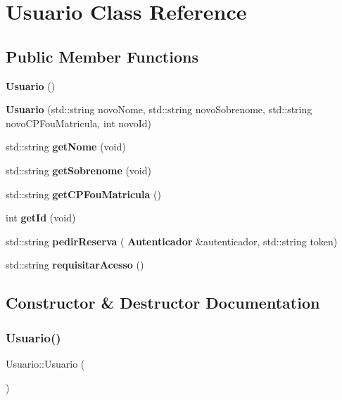\section{Usuario Class Reference}
\label{class_usuario}
\subsection*{Public Member Functions}
\begin{DoxyCompactItemize}
\item 
\textbf{ Usuario} ()
\item 
\textbf{ Usuario} (std\+::string novo\+Nome, std\+::string novo\+Sobrenome, std\+::string novo\+C\+P\+Fou\+Matricula, int novo\+Id)
\item 
std\+::string \textbf{ get\+Nome} (void)
\item 
std\+::string \textbf{ get\+Sobrenome} (void)
\item 
std\+::string \textbf{ get\+C\+P\+Fou\+Matricula} ()
\item 
int \textbf{ get\+Id} (void)
\item 
std\+::string \textbf{ pedir\+Reserva} (\textbf{ Autenticador} \&autenticador, std\+::string token)
\item 
std\+::string \textbf{ requisitar\+Acesso} ()
\end{DoxyCompactItemize}


\subsection{Constructor \& Destructor Documentation}
\mbox{\label{class_usuario_aa85a5371a098dfba5449140d9b8a472f}} 
\subsubsection{Usuario()\hspace{0.1cm}{\footnotesize\ttfamily [1/2]}}
{\footnotesize\ttfamily Usuario\+::\+Usuario (\begin{DoxyParamCaption}{ }\end{DoxyParamCaption})\hspace{0.3cm}{\ttfamily [inline]}}

\mbox{\label{class_usuario_a0c2e911df75a670a9893d1927fd98c71}} 
